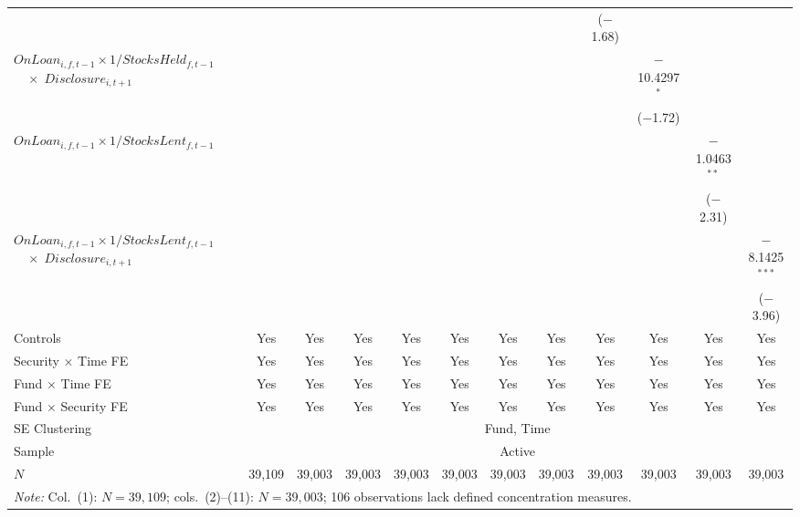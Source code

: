 {\begin{tabular}{l*{11}{c}}
 & & & & & & & & ($-$1.68) & & & \\[0.3em]
$\mathit{OnLoan}_{i,f,t-1} \times 1/\mathit{StocksHeld}_{f,t-1}$%
$\quad \times\; \mathit{Disclosure}_{i,t+1}$ & & & & & & & & & $-$10.4297$^{*}$ & & \\
 & & & & & & & & & ($-$1.72) & & \\[0.3em]
$\mathit{OnLoan}_{i,f,t-1} \times 1/\mathit{StocksLent}_{f,t-1}$ & & & & & & & & & & $-$1.0463$^{**}$ & \\
 & & & & & & & & & & ($-$2.31) & \\[0.3em]
$\mathit{OnLoan}_{i,f,t-1} \times 1/\mathit{StocksLent}_{f,t-1}$%
$\quad \times\; \mathit{Disclosure}_{i,t+1}$ & & & & & & & & & & & $-$8.1425$^{***}$ \\
 & & & & & & & & & & & ($-$3.96) \\
\midrule
Controls & Yes & Yes & Yes & Yes & Yes & Yes & Yes & Yes & Yes & Yes & Yes \\
Security $\times$ Time FE & Yes & Yes & Yes & Yes & Yes & Yes & Yes & Yes & Yes & Yes & Yes \\
Fund $\times$ Time FE & Yes & Yes & Yes & Yes & Yes & Yes & Yes & Yes & Yes & Yes & Yes \\
Fund $\times$ Security FE & Yes & Yes & Yes & Yes & Yes & Yes & Yes & Yes & Yes & Yes & Yes \\
SE Clustering & \multicolumn{11}{c}{Fund, Time} \\
Sample & \multicolumn{11}{c}{Active} \\
\midrule
$N$ & 39,109 & 39,003 & 39,003 & 39,003 & 39,003 & 39,003 & 39,003 & 39,003 & 39,003 & 39,003 & 39,003 \\
\multicolumn{12}{l}{\textit{Note:} Col.~(1): $N = 39{,}109$; cols.~(2)--(11): $N = 39{,}003$; 106 observations lack defined concentration measures.} \\
\bottomrule
\end{tabular}
}
